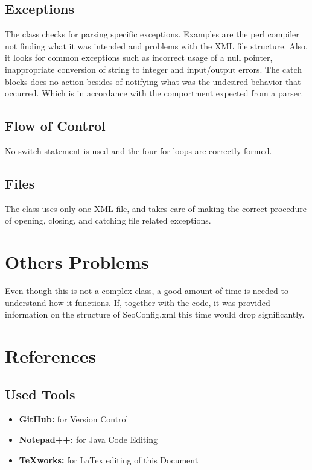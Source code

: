 \documentclass[a4paper]{article}
\begin{document}
\subsection{Exceptions}
The class checks for parsing specific exceptions. Examples are the perl compiler not finding what it was intended and problems with the XML file structure. \newline
 Also, it looks for common exceptions such as incorrect usage of a null pointer, inappropriate conversion of string to integer and input/output errors. \newline
 The catch blocks does no action besides of notifying what was the undesired behavior that occurred. Which is in accordance with the comportment expected from a parser. 

\subsection{Flow of Control}
No switch statement is used  and the four for loops are correctly formed.
\subsection{Files}
The class uses only one XML file, and takes care of making the correct procedure of opening, closing, and catching file related exceptions. 

\section{Others Problems}
Even though this is not a complex class, a good amount of time is needed to understand how it functions.  If, together with the code, it was provided information on the structure of SeoConfig.xml this time would drop significantly.

\newpage
\section{References}
\subsection{Used Tools}
\begin{itemize}
	\item \textbf{GitHub:} for Version Control
	\item \textbf {Notepad++:} for Java Code Editing
	\item \textbf {TeXworks:} for LaTex editing of this Document
\end{itemize}
\end{document}
